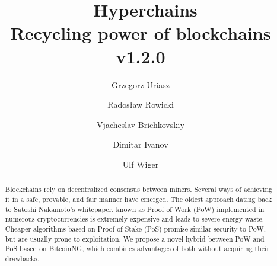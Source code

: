 \documentclass{article}
\title{\huge \aet\ Hyperchains \\[0.5em]
  \large Recycling power of blockchains
  \\[1em] v1.2.0 }
\author{ Grzegorz Uriasz
  \and Radosław Rowicki
  \and Vjacheslav Brichkovskiy
  \and Dimitar Ivanov
  \and Ulf Wiger
}
\begin{document}
\maketitle

\begin{abstract}
  Blockchains rely on decentralized consensus between miners. Several ways of
  achieving it in a safe, provable, and fair manner have emerged. The oldest
  approach dating back to Satoshi Nakamoto's whitepaper, known as Proof of Work
  (PoW) implemented in numerous cryptocurrencies is extremely expensive and
  leads to severe energy waste. Cheaper algorithms based on Proof of Stake
  (PoS) promise similar security to PoW, but are usually prone to exploitation.
  We propose a novel hybrid between PoW and PoS based on BitcoinNG, which
  combines advantages of both without acquiring their drawbacks.
\end{abstract}









 
\end{document}
